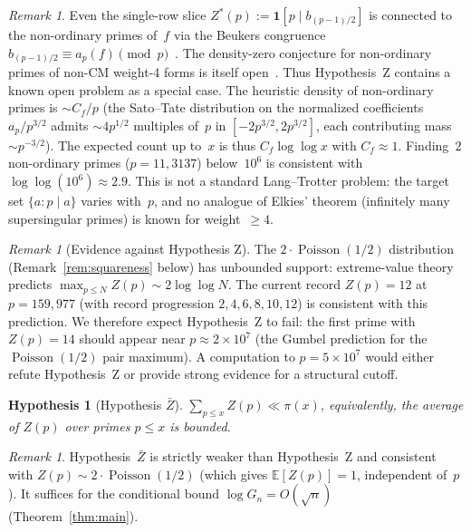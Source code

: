 \documentclass[11pt]{article}
\newtheorem{hypothesis}[theorem]{Hypothesis}
\theoremstyle{definition}
\theoremstyle{remark}
\newtheorem{remark}[theorem]{Remark}
\begin{document}
\begin{remark}\label{rem:open}
Even the single-row slice
$Z^*(p) := \mathbf{1}[p \mid b_{(p-1)/2}]$
is connected to the non-ordinary primes of~$f$
via the Beukers congruence
$b_{(p-1)/2} \equiv a_p(f) \pmod{p}$~\cite{Beukers1987,AhlgrenOno2000}.
The density-zero conjecture for non-ordinary primes of
non-CM weight-4 forms is itself open~\cite{JinMaOno2016}.
Thus Hypothesis~Z contains a known open problem
as a special case.
The heuristic density of non-ordinary primes is
$\sim C_f/p$
(the Sato--Tate distribution on the normalized
coefficients $a_p/p^{3/2}$ admits $\sim 4p^{1/2}$
multiples of~$p$ in $[-2p^{3/2}, 2p^{3/2}]$,
each contributing mass $\sim p^{-3/2}$).
The expected count up to~$x$ is thus
$C_f\log\log x$ with $C_f \approx 1$.
Finding~$2$ non-ordinary primes ($p = 11, 3137$)
below~$10^6$
is consistent with $\log\log(10^6) \approx 2.9$.
This is not a standard Lang--Trotter problem:
the target set $\{a : p \mid a\}$ varies with~$p$,
and no analogue of Elkies' theorem
(infinitely many supersingular primes)
is known for weight~$\ge 4$.
\end{remark}

\begin{remark}[Evidence against Hypothesis Z]\label{rem:Zfalse}
The $2 \cdot \operatorname{Poisson}(1/2)$ distribution
(Remark~\ref{rem:squareness} below) has unbounded support:
extreme-value theory predicts
$\max_{p \le N} Z(p) \sim 2\log\log N$.
The current record $Z(p) = 12$ at $p = 159{,}977$
(with record progression $2, 4, 6, 8, 10, 12$)
is consistent with this prediction.
We therefore expect Hypothesis~Z to fail:
the first prime with $Z(p) = 14$ should appear
near $p \approx 2 \times 10^7$
(the Gumbel prediction for the
$\operatorname{Poisson}(1/2)$ pair maximum).
A computation to $p = 5 \times 10^7$ would
either refute Hypothesis~Z or provide
strong evidence for a structural cutoff.
\end{remark}

\begin{hypothesis}[Hypothesis $\bar{Z}$]\label{hyp:Zbar}
$\displaystyle\sum_{p \le x} Z(p) \ll \pi(x)$,
equivalently,
the average of $Z(p)$ over primes $p \le x$ is bounded.
\end{hypothesis}

\begin{remark}\label{rem:Zbar}
Hypothesis~$\bar{Z}$ is strictly weaker
than Hypothesis~Z and consistent with
$Z(p) \sim 2 \cdot \operatorname{Poisson}(1/2)$
(which gives $\mathbb{E}[Z(p)] = 1$, independent of~$p$).
It suffices for the conditional bound
$\log G_n = O(\sqrt{n})$
(Theorem~\ref{thm:main}).
\end{remark}
\end{document}
